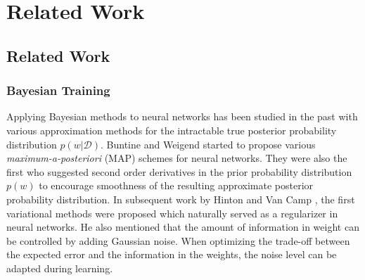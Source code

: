 \chapter{Related Work}

\ifpdf
    \graphicspath{{Chapter3/Figs/Raster/}{Chapter3/Figs/PDF/}{Chapter3/Figs/}}
\else
    \graphicspath{{Chapter3/Figs/Vector/}{Chapter3/Figs/}}
\fi


\pagebreak

\section{Related Work}

\subsection{Bayesian Training}
Applying Bayesian methods to neural networks has been studied in the past with various approximation methods for the intractable true posterior probability distribution $p(w|\mathcal{D})$. Buntine and Weigend \cite{buntine1991bayesian} started to propose various \textit{maximum-a-posteriori} (MAP) schemes for neural networks. They were also the first who suggested second order derivatives in the prior probability distribution $p(w)$ to encourage smoothness of the resulting approximate posterior probability distribution.
In subsequent work by Hinton and Van Camp \cite{hinton1993keeping}, the first variational methods were proposed which naturally served as a regularizer in neural networks. He also mentioned that the amount of information in weight can be controlled by adding Gaussian noise. When optimizing the trade-off between the expected error and the information in the weights, the noise level can be adapted during learning.


